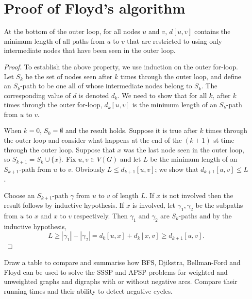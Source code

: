 \section{Proof of Floyd's algorithm}
\begin{Theorem} \label{thm:floyd}
At the bottom of the outer  loop, for all nodes $u$ and $v$,
$d[u,v]$ contains the minimum length of all paths from $u$ to $v$ that
are restricted to using only intermediate nodes that have been seen in
the outer  loop. 
\end{Theorem}

\vspace{-5mm}

\begin{proof}
To establish the above property, we use induction on the outer for-loop.
Let $S_k$ be the set of nodes seen after $k$ times through the
outer loop, and define an $S_k$-path  to be one all of whose
intermediate nodes belong to $S_k$. The corresponding value of $d$ is 
denoted $d_k$. We need to show that for all $k$, after $k$ times through 
the outer for-loop, $d_k[u,v]$ is the minimum length of an $S_k$-path 
from $u$ to $v$. 

When $k=0$, $S_0 = \emptyset$ and the result holds. Suppose
it is true after $k$ times through the outer loop and consider what
happens at the end of the $(k+1)$-st time through the outer loop.
Suppose that $x$ was the last node seen in the outer loop, so $S_{k+1}=
S_k \cup \{x\}$. Fix $u, v\in V(G)$ and let $L$ be the minimum length of
an $S_{k+1}$-path from $u$ to $v$. Obviously $L \leq d_{k+1}[u,v]$; we
show that $d_{k+1}[u,v] \leq L$. 

Choose an $S_{k+1}$-path $\gamma$ from $u$ to $v$ of length $L$. If $x$
is not involved then the result follows by inductive hypothesis. If $x$
is involved, let $\gamma_1, \gamma_2$ be the subpaths from $u$ to $x$
and $x$ to $v$ respectively. Then $\gamma_1$ and $\gamma_2$ are
$S_k$-paths and by the inductive hypothesis, $$L \geq |\gamma_1| +
|\gamma_2| = d_k[u,x] + d_k[x,v] \geq d_{k+1}[u,v]\text{.}$$
\end{proof}

\begin{Boxample}[8]
Draw a table to compare and summarise how BFS, Djikstra, Bellman-Ford and Floyd can be used to solve the SSSP and APSP problems for weighted and unweighted graphs and digraphs with or without negative arcs. Compare their running times and their ability to detect negative cycles.\end{Boxample}

